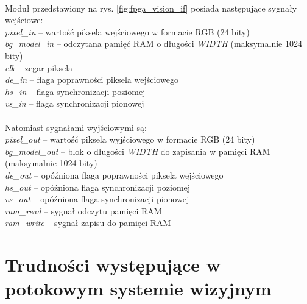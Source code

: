 \noindent \\Moduł przedstawiony na rys. \ref{fig:fpga_vision_if} posiada następujące sygnały wejściowe:\\
\-\hspace{1cm} \textit{pixel\_in} -- wartość piksela wejściowego w formacie RGB (24 bity)\\
\-\hspace{1cm} \textit{bg\_model\_in} -- odczytana pamięć RAM o długości \textit{WIDTH} (maksymalnie 1024 bity)\\
\-\hspace{1cm} \textit{clk} -- zegar piksela\\
\-\hspace{1cm} \textit{de\_in} -- flaga poprawności piksela wejściowego\\
\-\hspace{1cm} \textit{hs\_in} -- flaga synchronizacji poziomej\\
\-\hspace{1cm} \textit{vs\_in} -- flaga synchronizacji pionowej\\\\
%
Natomiast sygnałami wyjściowymi są:\\
\-\hspace{1cm} \textit{pixel\_out} -- wartość piksela wyjściowego w formacie RGB (24 bity)\\
\-\hspace{1cm} \textit{bg\_model\_out} -- blok o długości \textit{WIDTH} do zapisania w pamięci RAM (maksymalnie 1024 bity)\\
\-\hspace{1cm} \textit{de\_out} -- opóźniona flaga poprawności piksela wejściowego\\
\-\hspace{1cm} \textit{hs\_out} -- opóźniona flaga synchronizacji poziomej\\
\-\hspace{1cm} \textit{vs\_out} -- opóźniona flaga synchronizacji pionowej\\
\-\hspace{1cm} \textit{ram\_read} -- sygnał odczytu pamięci RAM\\
\-\hspace{1cm} \textit{ram\_write} -- sygnał zapisu do pamięci RAM\\

\section{Trudności występujące w potokowym systemie wizyjnym}
\label{sec:fpga_wprowadzenie}

